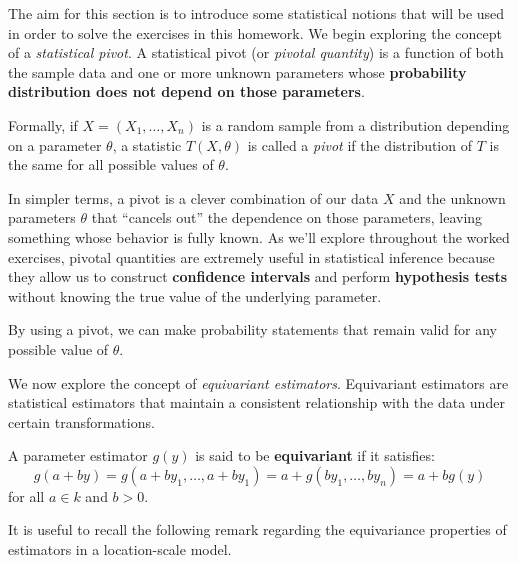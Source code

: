 The aim for this section is to introduce some statistical notions that will be used in order to solve the exercises in this homework.
We begin exploring the concept of a \textit{statistical pivot}. A statistical pivot (or \emph{pivotal quantity}) is a function of both the sample data and one or more unknown parameters whose \textbf{probability distribution does not depend on those parameters}. 
\begin{definition}

Formally, if $X = (X_1, \dots, X_n)$ is a random sample from a distribution depending on a parameter $\theta$, a statistic $T(X, \theta)$ is called a \emph{pivot} if the distribution of $T$ is the same for all possible values of $\theta$.
\end{definition}

In simpler terms, a pivot is a clever combination of our data $X$ and the unknown parameters $\theta$ that “cancels out” the dependence on those parameters, leaving something whose behavior is fully known. As we'll explore throughout the worked exercises,
pivotal quantities are extremely useful in statistical inference because they allow us to construct \textbf{confidence intervals} and perform \textbf{hypothesis tests} without knowing the true value of the underlying parameter.

\begin{remark} 
By using a pivot, we can make probability statements that remain valid for any possible value of $\theta$.
\end{remark}

\vspace{0.2cm}

We now explore the concept of \textit{equivariant estimators}. Equivariant estimators are statistical estimators that maintain a consistent relationship with the data under certain transformations.

\begin{definition}
    A parameter estimator $g(y)$ is said to be \textbf{equivariant} if it satisfies:
    $$g(a + by) = g(a + by_1, \ldots, a + by_1) = a + g(by_1, \ldots, by_n) = a + bg(y)$$
    for all $a \in k$ and $b > 0$.
\end{definition}

It is useful to recall the following remark regarding the equivariance properties of estimators in a location-scale model.

